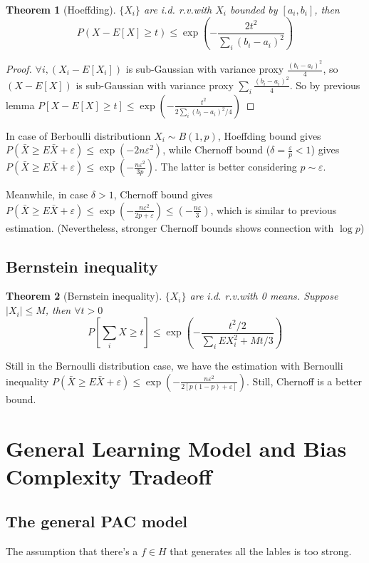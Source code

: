 \documentclass{book}
\newcommand{\rv}{r.v.}
\newtheorem{Thm}{Theorem}[section]
\begin{document}
\begin{Thm}[Hoeffding]
  $\{X_{i}\}$ are i.d. \rv with $X_{i}$ bounded by $[a_{i},b_{i}]$, then
  \[P(X-E[X]\geq t )\leq \exp(-\frac{2t^{2}}{\sum_{i}(b_{i}-a_{i})^{2}})\]
\end{Thm}

\begin{proof}
  $\forall i, (X_{i}-E[X_{i}])$ is sub-Gaussian with variance proxy $\frac{(b_{i}-a_{i})^{2}}{4}$, so $(X-E[X])$ is sub-Gaussian with variance proxy $\sum_{i}\frac{(b_{i}-a_{i})^{2}}{4}$. So by previous lemma $P[X-E[X]\geq t]\leq\exp(-\frac{t^{2}}{2\sum_{i}(b_{i}-a_{i})^{2}/4})$
\end{proof}




In case of Berboulli distributionn $X_{i}\sim B(1,p)$, Hoeffding bound gives $P(\bar X\geq E\bar X+\varepsilon)\leq \exp(-2n\varepsilon^{2})$, while Chernoff bound ($\delta=\frac{\varepsilon}{p}<1$) gives $P(\bar X\geq E\bar X+\varepsilon)\leq \exp(-\frac{n\varepsilon^{2}}{3p})$. The latter is better considering $p\sim\varepsilon$.

Meanwhile, in case $\delta>1$, Chernoff bound gives $P(\bar X\geq E\bar X+\varepsilon)\leq \exp(-\frac{n\varepsilon^{2}}{2p+\varepsilon})\leq (-\frac{n\varepsilon}{3})$, which is similar to previous estimation. (Nevertheless, stronger Chernoff bounds shows connection with $\log p$)

\section{Bernstein inequality}
\begin{Thm}[Bernstein inequality]
  $\{X_{i}\}$ are i.d. \rv with 0 means. Suppose $|X_{i}|\leq M$, then $\forall t>0$
  \[P[\sum_{i}X\geq t]\leq \exp(-\frac{t^{2}/2}{\sum_{i}EX_{i}^{2}+Mt/3})\]
\end{Thm}

Still in the Bernoulli distribution case, we have the estimation with Bernoulli inequality $P(\bar X\geq E\bar X+\varepsilon)\leq\exp(-\frac{n\varepsilon^{2}}{2[p(1-p)+\varepsilon]})$. Still, Chernoff is a better bound.

\chapter{General Learning Model and Bias Complexity Tradeoff}

\section{The general PAC model}
The assumption that there's a $f\in H$ that generates all the lables is too strong.
\end{document}
